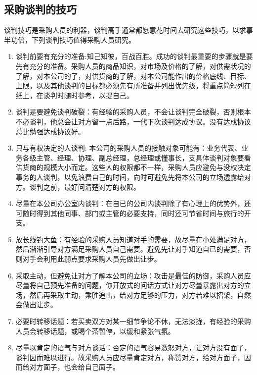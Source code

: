 \subsection {采购谈判的技巧}

    谈判技巧是采购人员的利器，谈判高手通常都愿意花时间去研究这些技巧，以求事半功倍，下列谈判技巧值得采购人员研究。

    \begin{enumerate}

        \item 谈判前要有充分的准备:知己知彼，百战百胜。成功的谈判最重要的步骤就是要先有充分的准备。采购人员的商品知识，对市场及价格的了解，对供需状况的了解，对本公司的了，对供货商的了解，对本公司能作出的价格底线、目标、上限，以及其他谈判的目标都必须先有所准备并列出优先级，将重点简短列在纸上，在谈判时随时参考，以提自己。

        \item 谈判是要避免谈判破裂：有经验的采购人员，不会让谈判完全破裂，否则根本不必谈判，他总会让对方留一点后路，一代下次谈判达成协议。没有达成协议总比勉强达成协议好。

        \item 只与有权决定的人谈判: 本公司的采购人员的接触对象可能有：业务代表、业务各级主管、经理、协理、副总经理，总经理或懂事长，支具体谈判对象要看供货商的规模大小而定。这些人的权限都不一样，采购人员应避免与没权决定事务的人谈判，以免浪费自己的时间，向时可避免先将本公司的立场透露绐对方。谈判之前，最好问清楚对方的权限。

        \item 尽量在本公司办公室内谈判：在自已的公司内谈判除了有心理上的优势外，还可随时得到其他同事、部门或主管的必要支持，同时还可节省时间与旅行的开支。

        \item 放长线钓大鱼：有经验的采购人员知道对手的需要，故尽量在小处满足对方，然后渐渐引导对方满足采购人员自己需要。避免先让对手知道自已的需要，否则对手会利用此弱点要求采购人员先做出让步。

        \item 采取主动，但避免让对方了解本公司的立场：攻击是最佳的防御，采购人员应尽量将自己预先准备的问题，你开放式的问话方式让对方尽量暴露出对方的立场，然后再采取主动，乘胜追击，给对方足够的压力，对方若难以招架，自然会做出让步。

        \item 必要时转移话题：若买卖双方对某一细节争论不休，无法淡拢，有经验的采购人员会转移话题，或喝个茶暂停，以缓和紧张气氛。

        \item 尽量以肯定的语气与对方谈话：否定的语气容易激怒对方，让对方没有面子，谈判因而难以进行。故采购人员应尽量肯定对方，称赞对方，给对方面子，因而给对方面子，也会给自己面子。


\end{enumerate}
